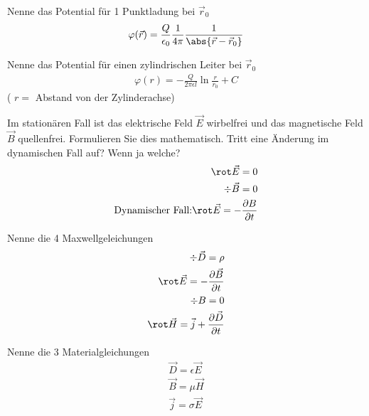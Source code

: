 \documentclass[a7paper,11pt,print,grid=front]{kartei}
\begin{document}
	\begin{karte}[Grundwissen]{Nenne das Potential für 1 Punktladung bei $\vec r_0$}
		\begin{eqnarray*}
			\varphi (\vec r ) = \frac{Q}{\epsilon_0} \frac{1}{4 \pi} \frac{1}{\abs{\vec r - \vec r_0}}
		\end{eqnarray*}
	\end{karte}
	
	
	\begin{karte}[Grundwissen]{Nenne das Potential für einen zylindrischen Leiter bei $\vec r_0$}
		\begin{eqnarray*}
			\varphi (r ) = - \frac{Q}{2 \pi \epsilon l} \ln \frac{r}{r_0} + C 
		\end{eqnarray*}
		( $r = $ Abstand von der Zylinderachse)
	\end{karte}
	
	
	\begin{karte}[Grundwissen]
	{Im stationären Fall ist das elektrische Feld $\vec E$ wirbelfrei und das magnetische Feld $\vec B$ quellenfrei. Formulieren Sie dies mathematisch. Tritt eine Änderung im dynamischen Fall auf? Wenn ja welche?}
		\begin{eqnarray*}
			\rot \vec E = 0 \\
			\div \vec B = 0 \\
			\text{Dynamischer Fall:} \rot \vec E = - \frac{\partial B}{\partial t}
		\end{eqnarray*}
	\end{karte}
	
	\begin{karte}{Nenne die 4 Maxwellgeleichungen}
		\begin{eqnarray*}
			\div \vec D = \rho \\
			\rot \vec E = - \frac{\partial \vec B}{\partial t} \\
			\div B = 0 \\
			\rot \vec H = \vec j + \frac{\partial \vec D}{\partial t}
		\end{eqnarray*}
	\end{karte}
	
	
	\begin{karte}{Nenne die 3 Materialgleichungen}
		\begin{eqnarray*}
			\vec D =  \epsilon \vec E \\
			\vec B = \mu \vec H \\
			\vec j = \sigma \vec E
		\end{eqnarray*}
	\end{karte}
	
\end{document}

